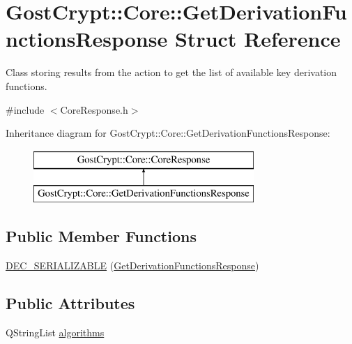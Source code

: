 \hypertarget{struct_gost_crypt_1_1_core_1_1_get_derivation_functions_response}{}\section{Gost\+Crypt\+:\+:Core\+:\+:Get\+Derivation\+Functions\+Response Struct Reference}
\label{struct_gost_crypt_1_1_core_1_1_get_derivation_functions_response}


Class storing results from the action to get the list of available key derivation functions.  




{\ttfamily \#include $<$Core\+Response.\+h$>$}

Inheritance diagram for Gost\+Crypt\+:\+:Core\+:\+:Get\+Derivation\+Functions\+Response\+:\begin{figure}[H]
\begin{center}
\leavevmode
\includegraphics[height=2.000000cm]{struct_gost_crypt_1_1_core_1_1_get_derivation_functions_response}
\end{center}
\end{figure}
\subsection*{Public Member Functions}
\begin{DoxyCompactItemize}
\item 
\hyperlink{struct_gost_crypt_1_1_core_1_1_get_derivation_functions_response_a2003bffc7d00761e333ee539a31a5507}{D\+E\+C\+\_\+\+S\+E\+R\+I\+A\+L\+I\+Z\+A\+B\+LE} (\hyperlink{struct_gost_crypt_1_1_core_1_1_get_derivation_functions_response}{Get\+Derivation\+Functions\+Response})
\end{DoxyCompactItemize}
\subsection*{Public Attributes}
\begin{DoxyCompactItemize}
\item 
Q\+String\+List \hyperlink{struct_gost_crypt_1_1_core_1_1_get_derivation_functions_response_a506b39b1a61a13cd9d6baa987dd4c684}{algorithms}
\end{DoxyCompactItemize}


